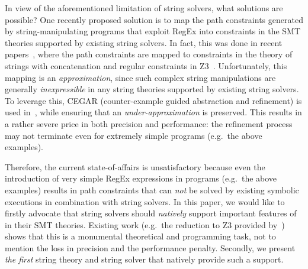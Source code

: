 In view of the aforementioned limitation of string solvers, what solutions are
possible? One recently proposed solution is to map the path constraints
generated by string-manipulating programs that exploit RegEx into constraints
in the SMT theories
supported by existing string solvers. In fact, this was done in recent papers~\cite{LMK19}, where the path constraints are mapped to constraints
in the theory of strings with concatenation and regular constraints in Z3~\cite{Z3}. Unfortunately, this mapping is an \emph{approximation}, since
such complex string manipulations are generally \emph{inexpressible} in any
string theories supported by existing string solvers.
%
To leverage this, CEGAR (counter-example guided
abstraction and refinement) is used in~\cite{LMK19}, while ensuring that an
\emph{under-approximation} is preserved.
This results in a rather severe price in both precision and performance: the
refinement process may not terminate even for extremely simple programs
(e.g.\ the above examples).

Therefore, the current state-of-affairs is unsatisfactory because even
the introduction of very simple RegEx expressions in programs (e.g.\ the above
examples) results in path constraints that can \emph{not} be solved by existing
symbolic executions in combination with string solvers. In this paper, we would
like to firstly advocate that string solvers should \emph{natively} support
important features of \regexp{}
in their SMT theories.
Existing work
(e.g.\ the reduction to Z3 provided by~\cite{LMK19}) shows that this is a
monumental theoretical and programming task,
not to mention the loss in precision and the performance penalty. Secondly, we
present \emph{the first} string
theory and string solver that natively provide such a support.


